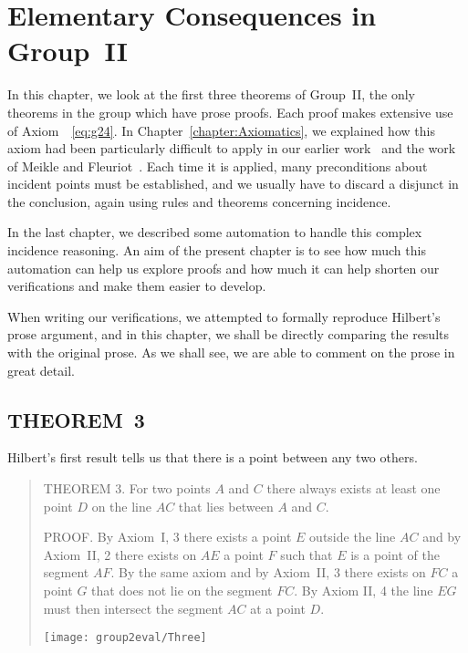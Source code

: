 \chapter{Elementary Consequences in Group~II}\label{chapter:Group2Eval}
In this chapter, we look at the first three theorems of Group~II, the only theorems in the group which have prose proofs. Each proof makes extensive use of Axiom~~\ref{eq:g24}. In Chapter~\ref{chapter:Axiomatics}, we explained how this axiom had been particularly difficult to apply in our earlier work~\cite{ScottMScThesis} and the work of Meikle and Fleuriot~\cite{MeikleFleuriotFormalizingHilbert}. Each time it is applied, many preconditions about incident points must be established, and we usually have to discard a disjunct in the conclusion, again using rules and theorems concerning incidence.

In the last chapter, we described some automation to handle this complex incidence reasoning. An aim of the present chapter is to see how much this automation can help us explore proofs and how much it can help shorten our verifications and make them easier to develop. 

When writing our verifications, we attempted to formally reproduce Hilbert's prose argument, and in this chapter, we shall be directly comparing the results with the original prose. As we shall see, we are able to comment on the prose in great detail.

\section{THEOREM~3}\label{sec:Theorem3}
Hilbert's first result tells us that there is a point between any two others.

\begin{quotation}
THEOREM 3. For two points $A$ and $C$ there always exists at least one point $D$ on the line $AC$ that lies between $A$ and $C$.

PROOF. By Axiom~I, 3 there exists a point $E$ outside the line $AC$ and by Axiom~II, 2 there exists on $AE$ a point $F$ such that $E$ is a point of the segment $AF$. By the same axiom and by Axiom~II, 3 there exists on $FC$ a point $G$ that does not lie on the segment $FC$. By Axiom II, 4 the line $EG$ must then intersect the segment $AC$ at a point $D$.

\centering\texttt{[image: group2eval/Three]}
\end{quotation}


